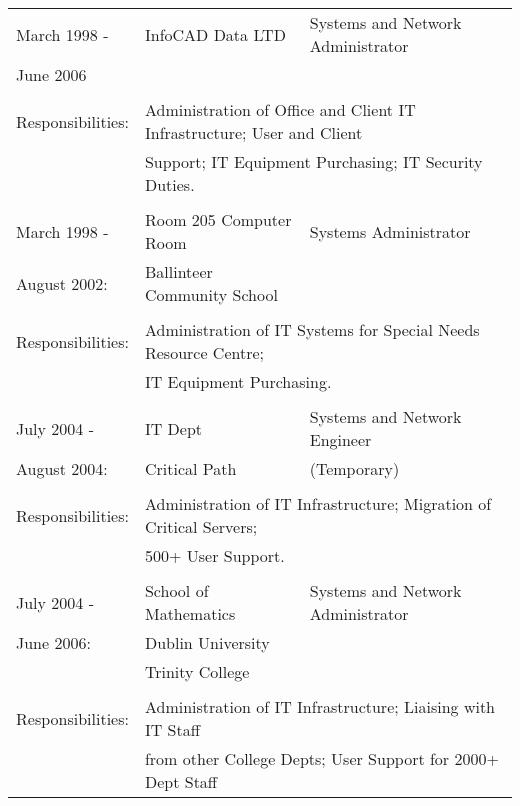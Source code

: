 \documentclass[a4paper, 11pt] {article}
\begin{document}
\begin{tabular}{llll}
March 1998 - 		&	InfoCAD Data LTD	& Systems and Network Administrator	&	\hspace{10mm}	\\
June 2006  			&			&              &            			\\
      				&			&              &            			\\
Responsibilities:	& \multicolumn{3}{l}{Administration of Office and Client IT Infrastructure; User and Client} 	\\
						& \multicolumn{3}{l}{Support; IT Equipment Purchasing; IT Security Duties.} 	\\
      				&              						&  &	\\
March 1998 -		& 	Room 205 Computer Room			&	Systems Administrator	& \hspace{10mm}	\\
August 2002:		&  Ballinteer Community School	&	&	\\
						& 		&	\\
Responsibilities:	& \multicolumn{3}{l}{Administration of IT Systems for Special Needs Resource Centre;} 	\\
						& \multicolumn{3}{l}{IT Equipment Purchasing.} 	\\
						& 											&	&	\\
July 2004 -			& IT Dept								&	Systems and Network Engineer	& \hspace{10mm}\\
August 2004:		& Critical Path						& (Temporary)	&	\\
						& 											&	&	\\
Responsibilities:	& \multicolumn{3}{l}{Administration of IT Infrastructure; Migration of Critical Servers;}	\\ 
						& \multicolumn{3}{l}{500+ User Support.} 	\\
						&												&\\
July 2004 -			& 	School of Mathematics	&	Systems and Network Administrator &	\\
June 2006:			& 	Dublin University			&	&	\\
						& 	Trinity College			&	&	\\
						& 									&	&	\\
Responsibilities:	& \multicolumn{3}{l}{Administration of IT Infrastructure; Liaising with IT Staff}	\\ 
						& \multicolumn{3}{l}{from other College Depts; User Support for 2000+ Dept Staff}	\\

\end{tabular}
\end{document}
